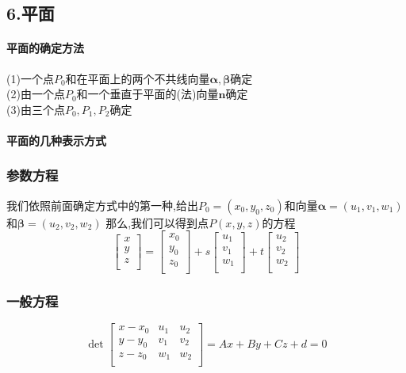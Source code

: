 \documentclass{article}
\newcommand{\ve}{\boldsymbol}
\begin{document}
\begin{CJK}{UTF8}{gkai}
\subsection*{6.平面}
\paragraph{平面的确定方法\\}
(1)一个点$P_0$和在平面上的两个不共线向量$\ve{\alpha},\ve{\beta}$确定\\
(2)由一个点$P_0$和一个垂直于平面的(法)向量$\ve{n}$确定\\
(3)由三个点$P_0,P_1,P_2$确定\\
\paragraph{平面的几种表示方式\\}
\subsubsection*{参数方程}
我们依照前面确定方式中的第一种,给出$P_0=(x_0,y_0,z_0)$和向量$\ve{\alpha}=(u_1,v_1,w_1)$和$\ve{\beta}=(u_2,v_2,w_2)$
那么,我们可以得到点$P(x,y,z)$的方程\\
\[\begin{bmatrix}
    x\\
    y\\
    z\\
\end{bmatrix}
=
    \begin{bmatrix}
        x_0\\
        y_0\\
        z_0\\
    \end{bmatrix}
    +s
    \begin{bmatrix}
        u_1\\
        v_1\\
        w_1\\
    \end{bmatrix}
            +t
\begin{bmatrix}
    u_2\\
    v_2\\
    w_2\\
\end{bmatrix}\]


\subsubsection*{一般方程}
\[\det\begin{bmatrix}
x-x_0&u_1&u_2\\
y-y_0&v_1&v_2\\
z-z_0&w_1&w_2\\   
\end{bmatrix}
=Ax+By+Cz+d=0\]


\end{CJK}
\end{document}
